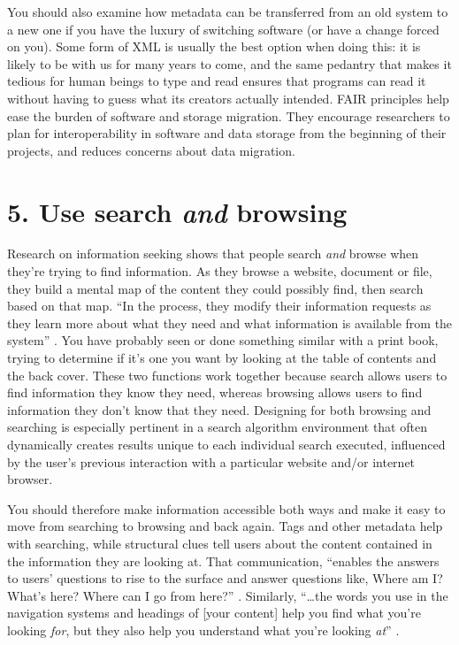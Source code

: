 \documentclass[10pt,letterpaper]{article}
\newcommand{\rulemajor}[1]{\section*{#1}}
\begin{document}
You should also examine how metadata can be transferred from an old system to a
new one if you have the luxury of switching software (or have a change forced on
you). Some form of XML is usually the best option when doing this: it is likely
to be with us for many years to come, and the same pedantry that makes it
tedious for human beings to type and read ensures that programs can read it
without having to guess what its creators actually intended. FAIR principles
help ease the burden of software and storage migration. They encourage
researchers to plan for interoperability in software and data storage from the
beginning of their projects, and reduces concerns about data migration.

\rulemajor{5. Use search \emph{and} browsing}

Research on information seeking shows that people search \emph{and} browse when
they're trying to find information. As they browse a website, document or
file, they build a mental map of the content they could possibly find, then
search based on that map. ``In the process, they modify their information
requests as they learn more about what they need and what information is
available from the system'' \cite{Rosenfeld2015}. You have probably seen or
done something similar with a print book, trying to determine if it's one you
want by looking at the table of contents and the back cover. These two
functions work together because search allows users to find information they
know they need, whereas browsing allows users to find information they don't
know that they need\cite{Bates2002}. Designing for both browsing and searching
is especially pertinent in a search algorithm environment that often dynamically
creates results unique to each individual search executed, influenced by the
user's previous interaction with a particular website and/or internet browser.

You should therefore make information accessible both ways and make it easy to
move from searching to browsing and back again. Tags and other metadata help
with searching, while structural clues tell users about the content contained in
the information they are looking at. That communication, ``enables the answers
to users' questions to rise to the surface and answer questions like, Where am
I? What's here? Where can I go from here?''  \cite{Rosenfeld2015}. Similarly,
``{\ldots}the words you use in the navigation systems and headings of [your
  content] help you find what you're looking \emph{for}, but they also help you
understand what you're looking \emph{at}'' \cite{Arango2018}.
\end{document}
